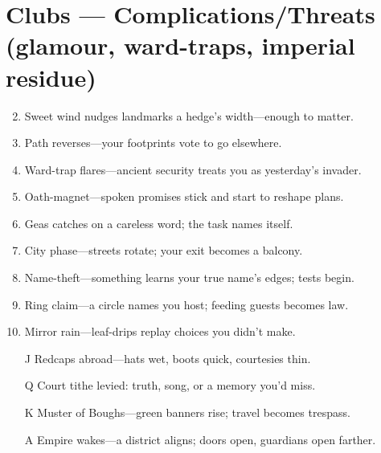 \section*{Clubs --- Complications/Threats (glamour, ward-traps, imperial residue)}
\begin{enumerate}
\setcounter{enumi}{1}
\item Sweet wind nudges landmarks a hedge's width---enough to matter.
\item Path reverses---your footprints vote to go elsewhere.
\item Ward-trap flares---ancient security treats you as yesterday's invader.
\item Oath-magnet---spoken promises stick and start to reshape plans.
\item Geas catches on a careless word; the task names itself.
\item City phase---streets rotate; your exit becomes a balcony.
\item Name-theft---something learns your true name's edges; tests begin.
\item Ring claim---a circle names you host; feeding guests becomes law.
\item Mirror rain---leaf-drips replay choices you didn't make.
\item[J] Redcaps abroad---hats wet, boots quick, courtesies thin.
\item[Q] Court tithe levied: truth, song, or a memory you'd miss.
\item[K] Muster of Boughs---green banners rise; travel becomes trespass.
\item[A] Empire wakes---a district aligns; doors open, guardians open farther.
\end{enumerate}

